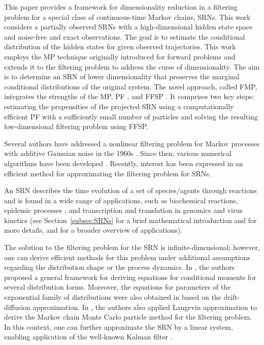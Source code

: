 This paper provides a framework for dimensionality reduction in a filtering problem for a special class of continuous-time Markov chains, \acfp{SRN}. This work considers a partially observed \acp{SRN} with a high-dimensional hidden state space and noise-free and exact observations. The goal is to estimate the conditional distribution of the hidden states for given observed trajectories. This work employs the \acf{MP} technique originally introduced for forward problems \cite{Hammouda2023MP} and extends it to the filtering problem to address the curse of dimensionality. The aim is to determine an \ac{SRN} of lower dimensionality that preserves the marginal conditional distributions of the original system. The novel approach, called \acf{FMP}, integrates the strengths of the \ac{MP}, \acf{PF} \cite{Rathinam2021PFwithExactState}, and \acf{FFSP} \cite{DAmbrosio2022FFSP}. It comprises two key steps: estimating the propensities of the  projected \ac{SRN} using a computationally efficient \ac{PF} with a sufficiently small number of particles and  solving the resulting low-dimensional filtering problem using \ac{FFSP}.

Several authors have addressed a nonlinear filtering problem for Markov processes with additive Gaussian noise  in the 1960s \cite{Stratonovich1965Conditional, Kushner1967Dynamical, Zakai1969Optimal}. Since then, various numerical algorithms have been developed \cite{Gordon1993PF, Cai1995adaptive, Lototsky1997SpectralApproach, Brigo1999ProjectionOnExp}. Recently, interest has been expressed in an efficient method for approximating the filtering problem for \acp{SRN}.

An \ac{SRN} describes the time evolution of a set of species/agents through reactions and is found in a wide range of applications, such as biochemical reactions, epidemic processes \cite{brauer2012mathematical, anderson2015stochastic}, and transcription and translation in genomics and virus kinetics \cite{srivastava2002stochastic, hensel2009stochastic} (see Section~\ref{subsec:SRNs} for a brief mathematical introduction and \cite{ben2020hierarchical, munker2024generic} for more details, and \cite{goutsias2013markovian} for a broader overview of applications). 

The solution to the filtering problem for the \ac{SRN} is infinite-dimensional; however, one can derive efficient methods for this problem under additional assumptions regarding the distribution shape or the process dynamics. In \cite{Wiederanders2022AutomatedGeneration}, the authors proposed a general framework for deriving equations for conditional moments for several distribution forms. Moreover, the equations for parameters of the exponential family of distributions were also obtained in \cite{Koyama2016ProjectionBased} based on the drift-diffusion approximation. In \cite{Golightly2011particleMCMC}, the authors also applied Langevin approximation to derive the Markov chain Monte Carlo particle method for the filtering problem. In this context, one can further approximate the \ac{SRN} by a linear system, enabling application of the well-known Kalman filter \cite{Folia2018LNAwithKF}. 


